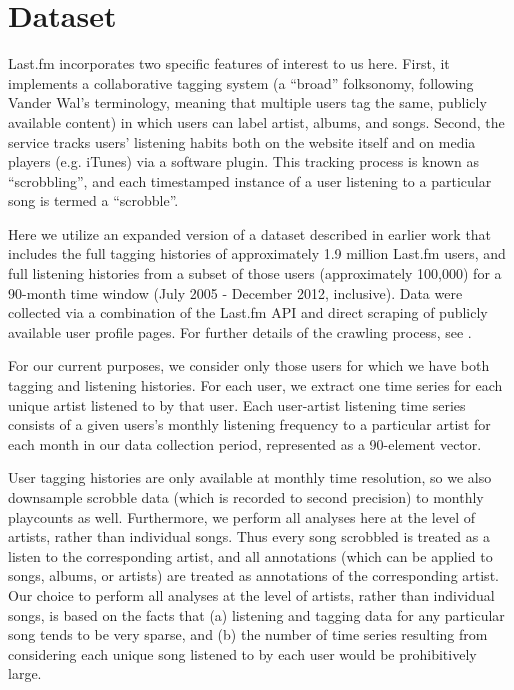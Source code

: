 \section{Dataset}
\label{sec_dataset}
Last.fm incorporates two specific features of interest to us here. First, it implements a collaborative tagging system (a ``broad'' folksonomy, following Vander Wal's \cite{VanderWal2005} terminology, meaning that multiple users tag the same, publicly available content) in which users can label artist, albums, and songs. Second, the service tracks users' listening habits both on the website itself and on media players (e.g. iTunes) via a software plugin. This tracking process is known as ``scrobbling'', and each timestamped instance of a user listening to a particular song is termed a ``scrobble''.

Here we utilize an expanded version of a dataset described in earlier work \cite{Lorince2013,Lorince2014} that includes the full tagging histories of approximately 1.9 million Last.fm users, and full listening histories from a subset of those users (approximately 100,000) for a 90-month time window (July 2005 - December 2012, inclusive). Data were collected via a combination of the Last.fm API and direct scraping of publicly available user profile pages. For further details of the crawling process, see \cite{Lorince2013,Lorince2014}.

For our current purposes, we consider only those users for which we have both tagging and listening histories. For each user, we extract one time series for each unique artist listened to by that user. Each user-artist listening time series consists of a given users's monthly listening frequency to a particular artist for each month in our data collection period, represented as a 90-element vector.

User tagging histories are only available at monthly time resolution, so we also downsample scrobble data (which is recorded to second precision) to monthly playcounts as well. Furthermore, we perform all analyses here at the level of artists, rather than individual songs. Thus every song scrobbled is treated as a listen to the corresponding artist, and all annotations (which can be applied to songs, albums, or artists) are treated as annotations of the corresponding artist. Our choice to perform all analyses at the level of artists, rather than individual songs, is based on the facts that (a) listening and tagging data for any particular song tends to be very sparse, and (b) the number of time series resulting from considering each unique song listened to by each user would be prohibitively large.

